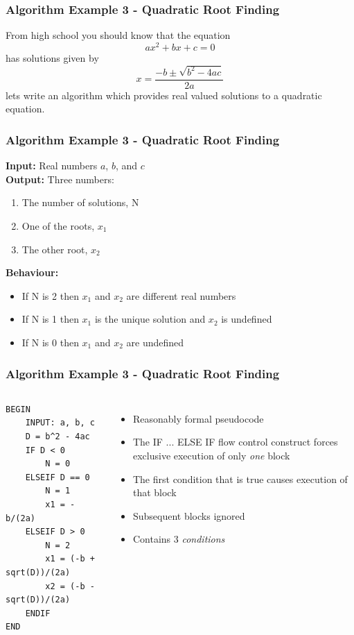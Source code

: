 \documentclass[14pt]{beamer}
\begin{document}
\begin{frame} %
\frametitle{Algorithm Example 3 - Quadratic Root Finding}
From high school you should know that the equation
\begin{equation}
a x^2 + b x + c = 0
\end{equation}
has solutions given by
\begin{equation}
x = \frac{-b \pm \sqrt{b^2 - 4 a c}}{2a}
\end{equation}
lets write an algorithm which provides real valued solutions to a quadratic equation.
\end{frame}

\begin{frame} %
\frametitle{Algorithm Example 3 - Quadratic Root Finding}
{\footnotesize
\textbf{Input:} Real numbers $a$, $b$, and $c$ \\
\textbf{Output:} Three numbers:
\begin{enumerate}
\item The number of solutions, N
\item One of the roots, $x_1$
\item The other root, $x_2$
\end{enumerate}
\textbf{Behaviour:}
\begin{itemize}
\item If N is 2 then $x_1$ and $x_2$ are different real numbers
\item If N is 1 then $x_1$ is the unique solution and $x_2$ is undefined
\item If N is 0 then $x_1$ and $x_2$ are undefined
\end{itemize} 
} 
\end{frame}

\begin{frame}[fragile] %
\frametitle{Algorithm Example 3 - Quadratic Root Finding}
\begin{columns}
\column{2in}
\begin{lstlisting}[style=pseudo,basicstyle=\ttfamily\scriptsize]
BEGIN
	INPUT: a, b, c
	D = b^2 - 4ac
	IF D < 0
		N = 0
	ELSEIF D == 0
		N = 1
		x1 = -b/(2a)
	ELSEIF D > 0
		N = 2
		x1 = (-b + sqrt(D))/(2a)
		x2 = (-b - sqrt(D))/(2a)
	ENDIF
END
\end{lstlisting}
\column{2.5in}
\footnotesize{
\begin{itemize}
\item Reasonably formal pseudocode
\item The IF ... ELSE IF flow control construct forces exclusive execution of only \textit{one} block
\item The first condition that is true causes execution of that block
\item Subsequent blocks ignored
\item Contains 3 \textit{conditions}
\end{itemize}
}
\end{columns}
\end{frame}
\end{document}

